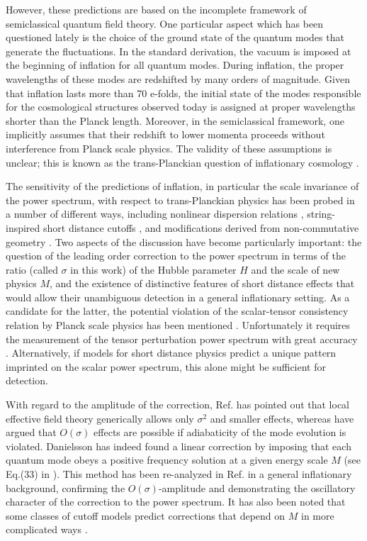\documentclass[a4paper,aps,prd,preprint,groupedaddress,nofootinbib]{revtex4}
\begin{document}
 
However, these predictions are based on the incomplete framework of
semiclassical quantum field theory.  One particular aspect which has
been questioned lately is the choice of the ground state of the
quantum modes that generate the fluctuations. In the standard
derivation, the vacuum is imposed at  the beginning of inflation for
all quantum modes. During inflation,  the proper wavelengths of
these modes are redshifted by many orders of magnitude.  Given that
inflation lasts more than 70 e-folds, the initial state of the modes
responsible for the cosmological structures  observed today is
assigned at proper wavelengths shorter than the Planck length.
Moreover, in the semiclassical framework, one implicitly assumes that
their redshift to lower  momenta proceeds without interference from
Planck scale physics.  The validity of these assumptions is unclear;
this is known as the trans-Planckian question of inflationary
cosmology \cite{J00}.

The sensitivity of the predictions of inflation, in particular the
scale invariance of the power spectrum, with respect to
trans-Planckian physics has been probed in a number of different ways,
including nonlinear dispersion relations
\cite{MB00,BM00,BJM01,N00,NP01,S02}, string-inspired short  distance
cutoffs \cite{K00,KN01,Eea01,Eea01b,HS02}, and modifications derived
from non-commutative geometry \cite{CGS00,Lea02b,BH02}. Two aspects of
the discussion have become particularly  important: the question of
the leading order correction to the power spectrum in terms of the
ratio (called $\sigma$ in this work) of the Hubble parameter $H$ and
the scale of new physics $M$, and the existence of distinctive
features of short distance effects that would allow their unambiguous
detection in a general inflationary setting. As a candidate for the
latter, the potential violation of the scalar-tensor consistency
relation by Planck scale physics has been mentioned
\cite{HK01}. Unfortunately it requires the measurement of the tensor
perturbation power spectrum with great accuracy
\cite{Kea02}. Alternatively, if models for short distance physics
predict a unique pattern imprinted on the scalar power spectrum, this
alone might be sufficient for detection.

With regard to the amplitude of the correction, Ref.\cite{Kea02} has
pointed out that local  effective field theory generically allows only
$\sigma^2$ and smaller effects, whereas \cite{BM02} have argued that
$O(\sigma)$ effects are possible if adiabaticity of the mode evolution
is violated.  Danielsson  \cite{D02} has indeed found a linear
correction by imposing  that each quantum mode obeys a
positive frequency solution at a given energy scale $M$ (see Eq.(33)
in  \cite{Eea02}). This method has been re-analyzed in
Ref.\cite{Eea02} in a general inflationary background, confirming the
$O(\sigma)$-amplitude and demonstrating the oscillatory character of
the correction to the power spectrum. It has also been noted that some
classes of cutoff models predict corrections that depend on $M$ in more
complicated ways \cite{SW02}. 
\end{document}
